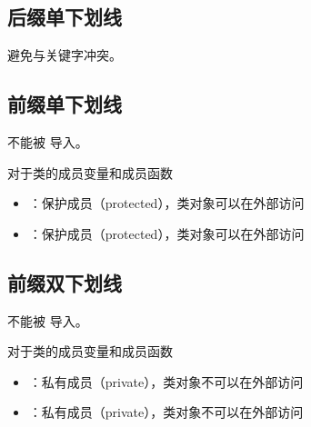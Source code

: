 \documentclass[letterpaper,10pt,english]{sphinxmanual}
\begin{document}
\subsection{后缀单下划线}
\label{\detokenize{python/13_name:id2}}
避免与关键字冲突。

%
\begin{sphinxVerbatim}[commandchars=\\\{\}]
  
\end{sphinxVerbatim}


\subsection{前缀单下划线}
\label{\detokenize{python/13_name:id3}}
不能被  导入。

对于类的成员变量和成员函数
\begin{itemize}
\item {} 
 ：保护成员（protected），类对象可以在外部访问

\item {} 
 ：保护成员（protected），类对象可以在外部访问

\end{itemize}


\subsection{前缀双下划线}
\label{\detokenize{python/13_name:id4}}
不能被  导入。

对于类的成员变量和成员函数
\begin{itemize}
\item {} 
 ：私有成员（private），类对象不可以在外部访问

\item {} 
 ：私有成员（private），类对象不可以在外部访问

\end{itemize}
\end{document}
